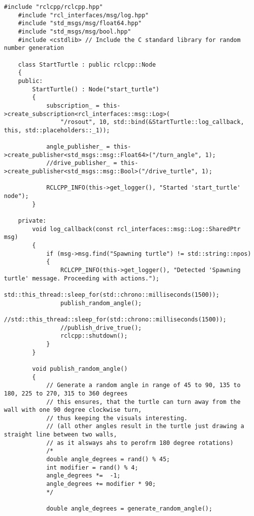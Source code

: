 \begin{lstlisting}[caption={\texttt{/start\_turtle} source code}, label={lst:start_turtle_source_code}]
    #include "rclcpp/rclcpp.hpp"
    #include "rcl_interfaces/msg/log.hpp"
    #include "std_msgs/msg/float64.hpp"
    #include "std_msgs/msg/bool.hpp"
    #include <cstdlib> // Include the C standard library for random number generation
    
    class StartTurtle : public rclcpp::Node
    {
    public:
        StartTurtle() : Node("start_turtle")
        {
            subscription_ = this->create_subscription<rcl_interfaces::msg::Log>(
                "/rosout", 10, std::bind(&StartTurtle::log_callback, this, std::placeholders::_1));
            
            angle_publisher_ = this->create_publisher<std_msgs::msg::Float64>("/turn_angle", 1);
            //drive_publisher_ = this->create_publisher<std_msgs::msg::Bool>("/drive_turtle", 1);
    
            RCLCPP_INFO(this->get_logger(), "Started 'start_turtle' node");
        }
    
    private:
        void log_callback(const rcl_interfaces::msg::Log::SharedPtr msg)
        {
            if (msg->msg.find("Spawning turtle") != std::string::npos)
            {
                RCLCPP_INFO(this->get_logger(), "Detected 'Spawning turtle' message. Proceeding with actions.");
                std::this_thread::sleep_for(std::chrono::milliseconds(1500));
                publish_random_angle();
                //std::this_thread::sleep_for(std::chrono::milliseconds(1500));
                //publish_drive_true();
                rclcpp::shutdown();
            }
        }
    
        void publish_random_angle()
        {
            // Generate a random angle in range of 45 to 90, 135 to 180, 225 to 270, 315 to 360 degrees
            // this ensures, that the turtle can turn away from the wall with one 90 degree clockwise turn,
            // thus keeping the visuals interesting.
            // (all other angles result in the turtle just drawing a straight line between two walls,
            // as it alsways ahs to perofrm 180 degree rotations)
            /*
            double angle_degrees = rand() % 45;
            int modifier = rand() % 4;
            angle_degrees *=  -1;
            angle_degrees += modifier * 90;
            */
    
            double angle_degrees = generate_random_angle();
    

\end{lstlisting}
